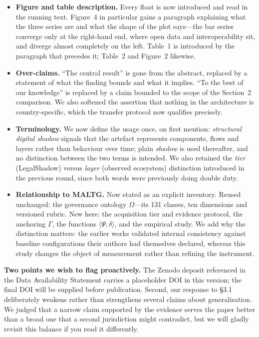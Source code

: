 \documentclass[11pt,a4paper]{article}
\begin{document}
\begin{itemize}
  \item \textbf{Figure and table description.} Every float is now introduced and read in the running text. Figure~4 in particular gains a paragraph explaining what the three series are and what the shape of the plot says---the bar series converge only at the right-hand end, where open data and interoperability sit, and diverge almost completely on the left. Table~1 is introduced by the paragraph that precedes it; Table~2 and Figure~2 likewise.
  \item \textbf{Over-claims.} ``The central result'' is gone from the abstract, replaced by a statement of what the finding bounds and what it implies. ``To the best of our knowledge'' is replaced by a claim bounded to the scope of the Section~2 comparison. We also softened the assertion that nothing in the architecture is country-specific, which the transfer protocol now qualifies precisely.
  \item \textbf{Terminology.} We now define the usage once, on first mention: \emph{structural digital shadow} signals that the artefact represents components, flows and layers rather than behaviour over time; plain \emph{shadow} is used thereafter, and no distinction between the two terms is intended. We also retained the \emph{tier} (LegalShadow) versus \emph{layer} (observed ecosystem) distinction introduced in the previous round, since both words were previously doing double duty.
  \item \textbf{Relationship to MALTG.} Now stated as an explicit inventory. Reused unchanged: the governance ontology $\Omega$---its 131 classes, ten dimensions and versioned rubric. New here: the acquisition tier and evidence protocol, the anchoring $\Gamma$, the functions $\langle\Psi,\delta\rangle$, and the empirical study. We add why the distinction matters: the earlier works validated internal consistency against baseline configurations their authors had themselves declared, whereas this study changes the object of measurement rather than refining the instrument.
\end{itemize}

\hrulefill

\vspace{6pt}
\noindent\textbf{Two points we wish to flag proactively.}
The Zenodo deposit referenced in the Data Availability Statement carries a placeholder DOI in this version; the final DOI will be supplied before publication. Second, our response to \S3.1 deliberately weakens rather than strengthens several claims about generalisation. We judged that a narrow claim supported by the evidence serves the paper better than a broad one that a second jurisdiction might contradict, but we will gladly revisit this balance if you read it differently.
\end{document}
